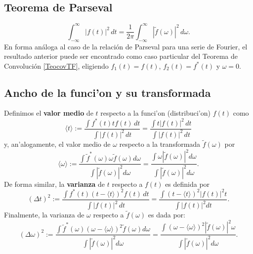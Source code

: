 \subsection{Teorema de Parseval}
\begin{equation}
\boxed{
\int_{-\infty}^\infty |f(t)|^2\,dt=\frac{1}{2\pi}\int_{-\infty}^\infty |\tilde{f}(\omega)|^2\,d\omega.
 }
\end{equation}
En forma análoga al caso de la relación de Parseval para una serie de Fourier, el resultado anterior puede ser encontrado como caso particular del Teorema de Convolución \eqref{TeocovTF}, eligiendo $f_1(t)=f(t)$, $f_2(t)=f^\ast(t)$ y $\omega=0$.
\subsection{Ancho de la funci'on y su transformada}

Definimos el \textbf{valor medio} de $t$ respecto a la funci'on (distribuci'on) $f(t)$ como
\begin{equation}
\langle t \rangle:=\frac{\int f^{*}(t) t f(t)\,dt}{\int |f(t)|^{2}\, dt}=\frac{\int t |f(t)|^2\,dt}{\int |f(t)|^2\,dt}
\end{equation}
y, an'alogamente, el valor medio de $\omega$ respecto a la transformada $\tilde{f}(\omega)$ por
\begin{equation}
\langle \omega \rangle:=\frac{\int \tilde{f}^{*}(\omega) \omega \tilde{f}(\omega) d\omega}{\int |\tilde{f}(\omega)|^{2} d\omega}=\frac{\int \omega |\tilde{f}(\omega)|^2 d\omega}{\int |\tilde{f}(\omega)|^2 d\omega}.
\end{equation}
De forma similar, la \textbf{varianza} de $t$ respecto a $f(t)$ es definida por
\begin{equation}
(\Delta t)^2:=\frac{\int f^{*}(t)(t-\langle t \rangle)^2 f(t)\,dt}{\int |f(t)|^2\, dt}=\frac{\int (t- \langle t \rangle)^2 |f(t)|^2 t}{\int |f(t)|^2 dt}.
\end{equation}
Finalmente, la varianza de $\omega$ respecto a $\tilde{f}(\omega)$ es dada por:
\begin{equation}
(\Delta \omega)^2:=\frac{\int \tilde{f}^{*}(\omega)(\omega-\langle \omega \rangle)^2 \tilde{f}( \omega) d\omega}{\int |\tilde{f}(\omega)|^2 d\omega}=\frac{\int (\omega- \langle \omega \rangle)^2 |\tilde{f}(\omega)|^2 \omega}{\int |\tilde{f}(\omega)|^2 d\omega}.
\end{equation}


